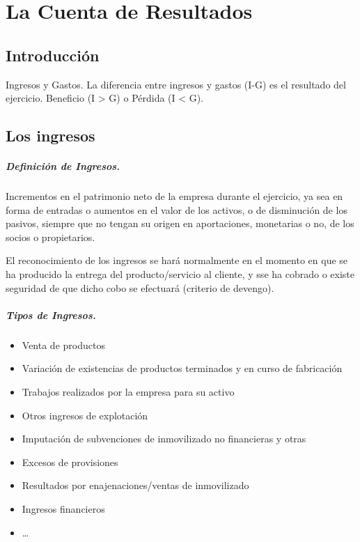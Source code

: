 \chapter{La Cuenta de Resultados}

\section{Introducción}
Ingresos y Gastos. La diferencia entre ingresos y gastos (I-G) es el resultado del ejercicio. Beneficio (I > G) o Pérdida (I < G).

\section{Los ingresos}
\paragraph{Definición de Ingresos.}
Incrementos en el patrimonio neto de la empresa durante el ejercicio, ya sea en forma de entradas o aumentos en el valor de los activos, o de disminución de los pasivos, siempre que no tengan su origen en aportaciones, monetarias o no, de los socios o propietarios.

El reconocimiento de los ingresos se hará normalmente en el momento en que se ha producido la entrega del producto/servicio al cliente, y sse ha cobrado o existe seguridad de que dicho cobo se efectuará (criterio de devengo).

\paragraph{Tipos de Ingresos.}
\begin{itemize}
    \item Venta de productos
    \item Variación de existencias de productos terminados y en curso de fabricación
    \item Trabajos realizados por la empresa para su activo
    \item Otros ingresos de explotación
    \item Imputación de subvenciones de inmovilizado no financieras y otras
    \item Excesos de provisiones
    \item Resultados por enajenaciones/ventas de inmovilizado
    \item Ingresos financieros
    \item \dots
\end{itemize}

